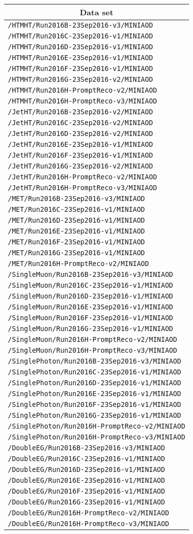 \begin{center}
\begin{tabular}{l}
\hline\hline
\multicolumn{1}{c}{Data set}\tabularnewline
\hline
\verb!/HTMHT/Run2016B-23Sep2016-v3/MINIAOD!\tabularnewline
\verb!/HTMHT/Run2016C-23Sep2016-v1/MINIAOD!\tabularnewline
\verb!/HTMHT/Run2016D-23Sep2016-v1/MINIAOD!\tabularnewline
\verb!/HTMHT/Run2016E-23Sep2016-v1/MINIAOD!\tabularnewline
\verb!/HTMHT/Run2016F-23Sep2016-v1/MINIAOD!\tabularnewline
\verb!/HTMHT/Run2016G-23Sep2016-v2/MINIAOD!\tabularnewline
\verb!/HTMHT/Run2016H-PromptReco-v2/MINIAOD!\tabularnewline
\verb!/HTMHT/Run2016H-PromptReco-v3/MINIAOD!\tabularnewline
\verb!/JetHT/Run2016B-23Sep2016-v2/MINIAOD!\tabularnewline
\verb!/JetHT/Run2016C-23Sep2016-v2/MINIAOD!\tabularnewline
\verb!/JetHT/Run2016D-23Sep2016-v2/MINIAOD!\tabularnewline
\verb!/JetHT/Run2016E-23Sep2016-v1/MINIAOD!\tabularnewline
\verb!/JetHT/Run2016F-23Sep2016-v1/MINIAOD!\tabularnewline
\verb!/JetHT/Run2016G-23Sep2016-v2/MINIAOD!\tabularnewline
\verb!/JetHT/Run2016H-PromptReco-v2/MINIAOD!\tabularnewline
\verb!/JetHT/Run2016H-PromptReco-v3/MINIAOD!\tabularnewline
\verb!/MET/Run2016B-23Sep2016-v3/MINIAOD!\tabularnewline
\verb!/MET/Run2016C-23Sep2016-v1/MINIAOD!\tabularnewline
\verb!/MET/Run2016D-23Sep2016-v1/MINIAOD!\tabularnewline
\verb!/MET/Run2016E-23Sep2016-v1/MINIAOD!\tabularnewline
\verb!/MET/Run2016F-23Sep2016-v1/MINIAOD!\tabularnewline
\verb!/MET/Run2016G-23Sep2016-v1/MINIAOD!\tabularnewline
\verb!/MET/Run2016H-PromptReco-v2/MINIAOD!\tabularnewline
\verb!/SingleMuon/Run2016B-23Sep2016-v3/MINIAOD!\tabularnewline
\verb!/SingleMuon/Run2016C-23Sep2016-v1/MINIAOD!\tabularnewline
\verb!/SingleMuon/Run2016D-23Sep2016-v1/MINIAOD!\tabularnewline
\verb!/SingleMuon/Run2016E-23Sep2016-v1/MINIAOD!\tabularnewline
\verb!/SingleMuon/Run2016F-23Sep2016-v1/MINIAOD!\tabularnewline
\verb!/SingleMuon/Run2016G-23Sep2016-v1/MINIAOD!\tabularnewline
\verb!/SingleMuon/Run2016H-PromptReco-v2/MINIAOD!\tabularnewline
\verb!/SingleMuon/Run2016H-PromptReco-v3/MINIAOD!\tabularnewline
\verb!/SinglePhoton/Run2016B-23Sep2016-v3/MINIAOD!\tabularnewline
\verb!/SinglePhoton/Run2016C-23Sep2016-v1/MINIAOD!\tabularnewline
\verb!/SinglePhoton/Run2016D-23Sep2016-v1/MINIAOD!\tabularnewline
\verb!/SinglePhoton/Run2016E-23Sep2016-v1/MINIAOD!\tabularnewline
\verb!/SinglePhoton/Run2016F-23Sep2016-v1/MINIAOD!\tabularnewline
\verb!/SinglePhoton/Run2016G-23Sep2016-v1/MINIAOD!\tabularnewline
\verb!/SinglePhoton/Run2016H-PromptReco-v2/MINIAOD!\tabularnewline
\verb!/SinglePhoton/Run2016H-PromptReco-v3/MINIAOD!\tabularnewline
\verb!/DoubleEG/Run2016B-23Sep2016-v3/MINIAOD!\tabularnewline
\verb!/DoubleEG/Run2016C-23Sep2016-v1/MINIAOD!\tabularnewline
\verb!/DoubleEG/Run2016D-23Sep2016-v1/MINIAOD!\tabularnewline
\verb!/DoubleEG/Run2016E-23Sep2016-v1/MINIAOD!\tabularnewline
\verb!/DoubleEG/Run2016F-23Sep2016-v1/MINIAOD!\tabularnewline
\verb!/DoubleEG/Run2016G-23Sep2016-v1/MINIAOD!\tabularnewline
\verb!/DoubleEG/Run2016H-PromptReco-v2/MINIAOD!\tabularnewline
\verb!/DoubleEG/Run2016H-PromptReco-v3/MINIAOD!\tabularnewline
\hline
\end{tabular}\end{center}

